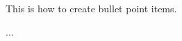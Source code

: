 \documentclass[20pt, a0paper, landscape, margin=15mm, innermargin=15mm,
     blockverticalspace=15mm, colspace=15mm, subcolspace=8mm]{tikzposter} %
\begin{document}
\begin{columns}
{\begin{minipage}[t]{30cm}
            \end{minipage}
            \hfill
            \begin{minipage}[t]{30cm}

                    \begin{itemsposter}
                    \item
                        This is how to create bullet point items.
                    \item
                        ...
                    \end{itemsposter}
                
            \end{minipage}
         
        }
	
	\end{columns}
	
\end{document}

